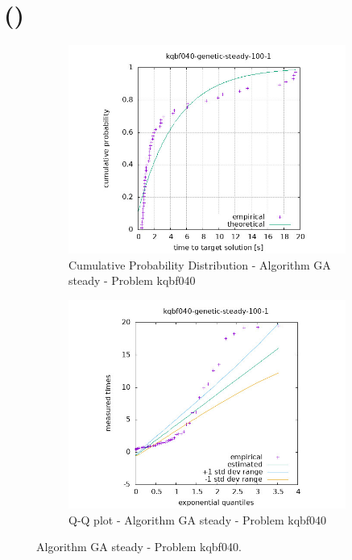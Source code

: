 \section{\tttfull (\ttt)}

\begin{figure}[H]
    \centering
    \begin{subfigure}{0.49\textwidth}
        \includegraphics[width=\textwidth]{figure/ttt_plot/kqbf040-genetic-steady-100-1-exp.jpeg}
        \caption{Cumulative Probability Distribution - Algorithm GA steady - Problem kqbf040}
        \label{fig:ga-steady-kqbf040-exp}
    \end{subfigure}
    \hfill
    \begin{subfigure}{0.49\textwidth}
        \includegraphics[width=\textwidth]{figure/ttt_plot/kqbf040-genetic-steady-100-1-qq.jpeg}
        \caption{Q-Q plot - Algorithm GA steady - Problem kqbf040}
        \label{fig:ga-steady-kqbf040-qq}
    \end{subfigure}
    \caption{Algorithm GA steady - Problem kqbf040.}
    \label{fig:ga-steady-kqbf040}
\end{figure}


